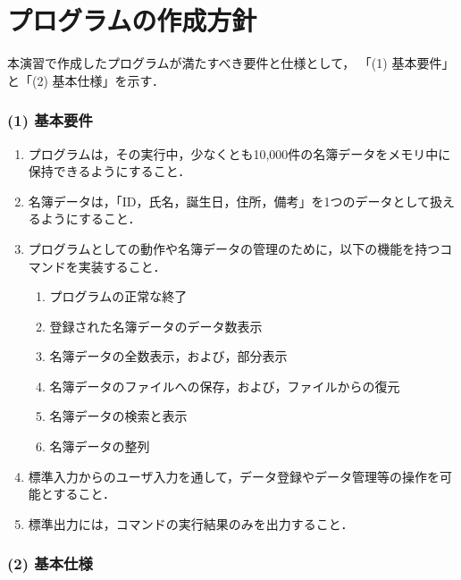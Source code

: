 \section{プログラムの作成方針}\label{sec:plan}

本演習で作成したプログラムが満たすべき要件と仕様として，
「(1) 基本要件」と「(2) 基本仕様」を示す．

\subsubsection*{(1) 基本要件}

\begin{enumerate}
  \setlength{\parskip}{0em} \setlength{\itemsep}{0.25em}  %
    \item プログラムは，その実行中，少なくとも10,000件の名簿データをメモリ中に保持できるようにすること．
    \item 名簿データは，「ID，氏名，誕生日，住所，備考」を1つのデータとして扱えるようにすること．
    \item プログラムとしての動作や名簿データの管理のために，以下の機能を持つコマンドを実装すること．
    \begin{enumerate} \setlength{\parskip}{0em} \setlength{\itemsep}{0.25em}
        \item プログラムの正常な終了
        \item 登録された名簿データのデータ数表示
        \item 名簿データの全数表示，および，部分表示
        \item 名簿データのファイルへの保存，および，ファイルからの復元
        \item 名簿データの検索と表示
        \item 名簿データの整列
    \end{enumerate}
    \item 標準入力からのユーザ入力を通して，データ登録やデータ管理等の操作を可能とすること．
    \item 標準出力には，コマンドの実行結果のみを出力すること．
\end{enumerate}

\subsubsection*{(2) 基本仕様}

